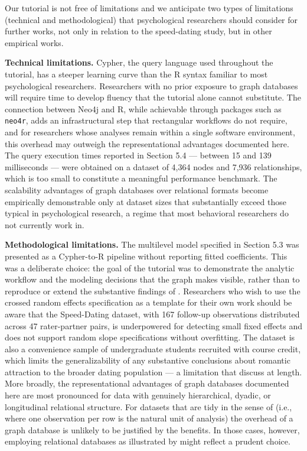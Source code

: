 \documentclass[sn-apa,pdflatex]{sn-jnl}
\theoremstyle{remark}
\theoremstyle{definition}
\begin{document}
Our tutorial is not free of limitations and we anticipate two types of
limitations (technical and methodological) that psychological
researchers should consider for further works, not only in relation to
the speed-dating study, but in other empirical works.

\textbf{Technical limitations.} Cypher, the query language used
throughout the tutorial, has a steeper learning curve than the R syntax
familiar to most psychological researchers. Researchers with no prior
exposure to graph databases will require time to develop fluency that
the tutorial alone cannot substitute. The connection between Neo4j and
R, while achievable through packages such as \texttt{neo4r}, adds an
infrastructural step that rectangular workflows do not require, and for
researchers whose analyses remain within a single software environment,
this overhead may outweigh the representational advantages documented
here. The query execution times reported in Section 5.4 --- between 15
and 139 milliseconds --- were obtained on a dataset of 4,364 nodes and
7,936 relationships, which is too small to constitute a meaningful
performance benchmark. The scalability advantages of graph databases
over relational formats become empirically demonstrable only at dataset
sizes that substantially exceed those typical in psychological research,
a regime that most behavioral researchers do not currently work in.

\textbf{Methodological limitations.} The multilevel model specified in
Section 5.3 was presented as a Cypher-to-R pipeline without reporting
fitted coefficients. This was a deliberate choice: the goal of the
tutorial was to demonstrate the analytic workflow and the modeling
decisions that the graph makes visible, rather than to reproduce or
extend the substantive findings of \citet{Selterman2015}. Researchers
who wish to use the crossed random effects specification as a template
for their own work should be aware that the Speed-Dating dataset, with
167 follow-up observations distributed across 47 rater-partner pairs, is
underpowered for detecting small fixed effects and does not support
random slope specifications without overfitting. The dataset is also a
convenience sample of undergraduate students recruited with course
credit, which limits the generalizability of any substantive conclusions
about romantic attraction to the broader dating population --- a
limitation that \citet{Selterman2015} discuss at length. More broadly,
the representational advantages of graph databases documented here are
most pronounced for data with genuinely hierarchical, dyadic, or
longitudinal relational structure. For datasets that are tidy in the
sense of \citet{Wickham2023} (i.e., where one observation per row is the
natural unit of analysis) the overhead of a graph database is unlikely
to be justified by the benefits. In those cases, however, employing
relational databases as illustrated by \citet{soto2025} might reflect a
prudent choice.
\end{document}
